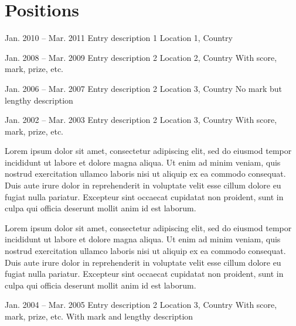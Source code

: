 
\section{Positions}%
    
\begin{cventries}[left]

    \cventry
    {Jan. 2010 -- Mar. 2011}%
    {Entry description 1}%
    {Location 1, Country}%
    {}%
    {}%

    \cventry
    {Jan. 2008 -- Mar. 2009}%
    {Entry description 2}%
    {Location 2, Country}%
    {With score, mark, prize, etc.}%
    {}%

    \cventry
    {Jan. 2006 -- Mar. 2007}%
    {Entry description 2}%
    {Location 3, Country}%
    {}%
    {No mark but lengthy description}%

    \cventry
    {Jan. 2002 -- Mar. 2003}%
    {Entry description 2}%
    {Location 3, Country}%
    {With score, mark, prize, etc.}%
    {%
        \begin{cvitems}%
            \item Lorem ipsum dolor sit amet, consectetur adipiscing elit, sed do eiusmod tempor incididunt ut labore et dolore magna aliqua. Ut enim ad minim veniam, quis nostrud exercitation ullamco laboris nisi ut aliquip ex ea commodo consequat. Duis aute irure dolor in reprehenderit in voluptate velit esse cillum dolore eu fugiat nulla pariatur. Excepteur sint occaecat cupidatat non proident, sunt in culpa qui officia deserunt mollit anim id est laborum.
            \item Lorem ipsum dolor sit amet, consectetur adipiscing elit, sed do eiusmod tempor incididunt ut labore et dolore magna aliqua. Ut enim ad minim veniam, quis nostrud exercitation ullamco laboris nisi ut aliquip ex ea commodo consequat. Duis aute irure dolor in reprehenderit in voluptate velit esse cillum dolore eu fugiat nulla pariatur. Excepteur sint occaecat cupidatat non proident, sunt in culpa qui officia deserunt mollit anim id est laborum.
        \end{cvitems}%
    }%
    
    \cventry
    {Jan. 2004 -- Mar. 2005}%
    {Entry description 2}%
    {Location 3, Country}%
    {With score, mark, prize, etc.}%
    {With mark and lengthy description}

\end{cventries}

